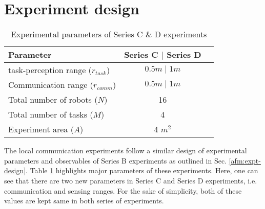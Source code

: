 \section{Experiment design}
\label{local-comm:expt-design}
%
\begin{table}[H]
\caption{Experimental parameters of Series C \& D experiments}
\label{table:expt-design}
\begin{center}
\begin{tabular}{|l|c|c|}
\hline Parameter & \hspace*{0.2cm} Series C $\mid$ Series D\\
\hline task-perception range ($r_{task}$) & $0.5 m \mid 1 m$\\
\hline Communication range ($r_{comm}$) & $0.5 m \mid 1 m$\\
\hline Total number of robots ($N$) & 16 \\
\hline Total number of tasks ($M$) & 4 \\
\hline Experiment area ($A$) & 4 $m^2$\\
\hline
\end{tabular}
\end{center}
\end{table}
%
The local communication experiments follow a similar design of experimental parameters and observables of Series B experiments as outlined in Sec. \ref{afm:expt-design}. Table \ref{table:expt-design} highlights  major parameters of these experiments. Here, one can see that there are two new parameters in Series C and Series D experiments, i.e. communication and sensing ranges. For the sake of simplicity, both of these values are kept same in both series of experiments.\\

